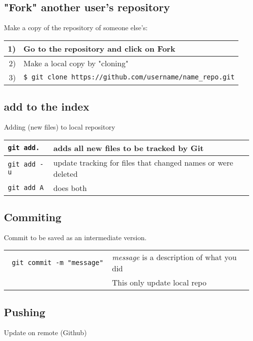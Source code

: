 \documentclass[a4paper,12pt]{report}
\newcommand{\code}[1]{\texttt{#1} }
\begin{document}
\subsection{"Fork" another user's repository}
Make a copy of the repository of someone else's:
\begin{table}[H]
\centering
\begin{tabular}{|r|l|}
  \hline 
1) & Go to the repository and click on Fork \\
\hline
2) & Make a local copy by "cloning" \\
\hline
3) & \code{\$ git clone \textcolor[rgb]{0,0.58,0}{https://github.com/username/name\_repo.git}} \\
  \hline 
\end{tabular}
\end{table}

\subsection{add to the index}
Adding (new files) to local repository
\begin{table}[H]
\centering
\begin{tabular}{|l|l|}
  \hline 
\code{\textcolor[rgb]{0,0,1}{git} add.} & adds all new files to be tracked by Git \\
\hline
\code{\textcolor[rgb]{0,0,1}{git} add \textcolor[rgb]{1,0,0}{-u}} & update tracking for files that changed names or were deleted \\
\hline
\code{\textcolor[rgb]{0,0,1}{git} add \textcolor[rgb]{1,0,0}{A}} & does both \\
  \hline 
\end{tabular}
\end{table}

\subsection{Commiting}
Commit to be saved as an intermediate version.
\begin{table}[H]
\centering
\begin{tabular}{|l|l|}
  \hline 
\code { \textcolor[rgb]{0,0,1}{git} commit \textcolor[rgb]{1,0,0}{-m} "message" } & \textit{message} is a description of what you did \\
& This only update local repo \\
  \hline 
\end{tabular}
\end{table}
\subsection{Pushing}
Update on remote (Github)
\begin{tcolorbox}
\end{tcolorbox}
\end{document}

